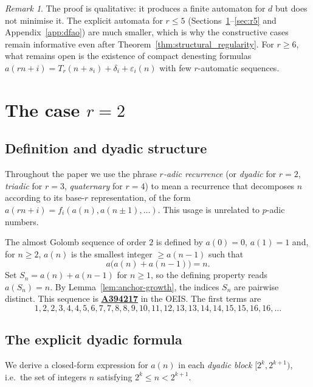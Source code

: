 \documentclass[12pt]{article}
\theoremstyle{definition}
\theoremstyle{remark}
\newtheorem{remark}[theorem]{Remark}
\newcommand{\oeis}[1]{\href{https://oeis.org/#1}{\textbf{#1}}}
\begin{document}
\begin{remark}
The proof is qualitative: it produces a finite automaton for $d$ but does not
minimise it. The explicit automata for $r\le 5$ (Sections~\ref{sec:r2}--\ref{sec:r5}
and Appendix~\ref{app:dfao}) are much smaller, which is why the
constructive cases remain informative even after Theorem~\ref{thm:structural_regularity}.
For $r\ge 6$, what remains open is the existence of compact denesting formulas
$a(rn+i)=T_r(n+s_i)+\delta_i+\varepsilon_i(n)$ with few $r$-automatic sequences.
\end{remark}



\section{The case $r=2$}\label{sec:r2}

\subsection{Definition and dyadic structure}

Throughout the paper we use the phrase \emph{$r$-adic recurrence} (or
\emph{dyadic} for $r=2$, \emph{triadic} for $r=3$, \emph{quaternary} for $r=4$)
to mean a recurrence that decomposes $n$ according to its base-$r$ representation,
of the form $a(rn+i) = f_i(a(n), a(n\pm 1), \ldots)$. This usage is unrelated to
$p$-adic numbers.

The almost Golomb sequence of order $2$ is defined by $a(0)=0$, $a(1)=1$ and,
for $n\ge 2$, $a(n)$ is the smallest integer $\ge a(n-1)$ such that
\begin{equation}\label{eq:r2def}
  a\bigl(a(n)+a(n-1)\bigr) = n.
\end{equation}
Set $S_n = a(n)+a(n-1)$ for $n\ge 1$, so the defining property reads $a(S_n)=n$.
By Lemma~\ref{lem:anchor-growth}, the indices $S_n$ are pairwise distinct.
This sequence is \oeis{A394217} in the OEIS. The first terms are
\[
  1,2,2,3,4,4,5,6,7,7,8,8,9,10,11,12,13,13,14,14,15,15,16,16,\ldots
\]


\subsection{The explicit dyadic formula}

We derive a closed-form expression for $a(n)$ in each
\emph{dyadic block} $[2^k, 2^{k+1})$, i.e.\ the set of integers
$n$ satisfying $2^k \le n < 2^{k+1}$.
\end{document}
